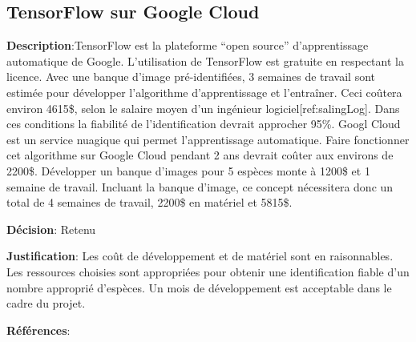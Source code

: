 

\subsection{TensorFlow sur Google Cloud}
\label{s:identifier_conc1}

\textbf{Description}:TensorFlow est la plateforme “open source” d'apprentissage automatique de Google. L’utilisation de TensorFlow est gratuite en respectant la licence. Avec une banque d’image pré-identifiées, 3 semaines de travail sont estimée pour développer l'algorithme d’apprentissage et l’entraîner. Ceci coûtera environ 4615\$, selon le salaire moyen d’un ingénieur logiciel[ref:salingLog]. Dans ces conditions la fiabilité de l’identification devrait approcher 95\%. Googl Cloud est un service nuagique qui permet l’apprentissage automatique. Faire fonctionner cet algorithme sur Google Cloud pendant 2 ans devrait coûter aux environs de 2200\$. Développer un banque d’images pour 5 espèces monte à 1200\$ et 1 semaine de travail. Incluant la banque d’image, ce concept nécessitera donc un total de 4 semaines de travail, 2200\$ en matériel et 5815\$.

\textbf{Décision}: Retenu

\textbf{Justification}: Les coût de développement et de matériel sont en raisonnables. Les ressources choisies sont appropriées pour obtenir une identification fiable d’un nombre approprié d’espèces. Un mois de développement est acceptable dans le cadre du projet.

\textbf{Références}:
\cite{googCloud, tensorFlow, liscapache2,sal_ingLog, fishID_2016}